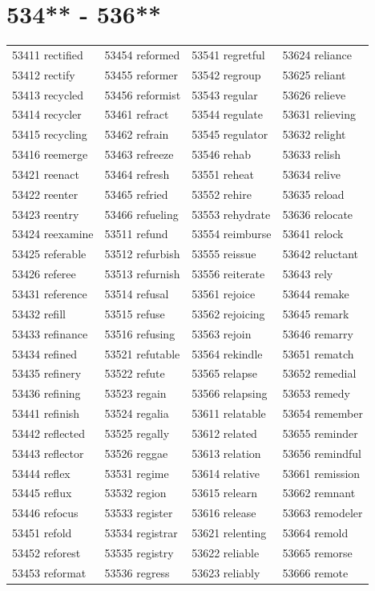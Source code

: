 \documentclass[10pt, oneside]{book}
\begin{document}
\begin{table}
	\centering
	\section*{534** - 536**}
	\begin{tabular}{l l l l}
53411 rectified &53454 reformed &53541 regretful &53624 reliance\\
53412 rectify &53455 reformer &53542 regroup &53625 reliant\\
53413 recycled &53456 reformist &53543 regular &53626 relieve\\
53414 recycler &53461 refract &53544 regulate &53631 relieving\\
53415 recycling &53462 refrain &53545 regulator &53632 relight\\
53416 reemerge &53463 refreeze &53546 rehab &53633 relish\\
53421 reenact &53464 refresh &53551 reheat &53634 relive\\
53422 reenter &53465 refried &53552 rehire &53635 reload\\
53423 reentry &53466 refueling &53553 rehydrate &53636 relocate\\
53424 reexamine &53511 refund &53554 reimburse &53641 relock\\
53425 referable &53512 refurbish &53555 reissue &53642 reluctant\\
53426 referee &53513 refurnish &53556 reiterate &53643 rely\\
53431 reference &53514 refusal &53561 rejoice &53644 remake\\
53432 refill &53515 refuse &53562 rejoicing &53645 remark\\
53433 refinance &53516 refusing &53563 rejoin &53646 remarry\\
53434 refined &53521 refutable &53564 rekindle &53651 rematch\\
53435 refinery &53522 refute &53565 relapse &53652 remedial\\
53436 refining &53523 regain &53566 relapsing &53653 remedy\\
53441 refinish &53524 regalia &53611 relatable &53654 remember\\
53442 reflected &53525 regally &53612 related &53655 reminder\\
53443 reflector &53526 reggae &53613 relation &53656 remindful\\
53444 reflex &53531 regime &53614 relative &53661 remission\\
53445 reflux &53532 region &53615 relearn &53662 remnant\\
53446 refocus &53533 register &53616 release &53663 remodeler\\
53451 refold &53534 registrar &53621 relenting &53664 remold\\
53452 reforest &53535 registry &53622 reliable &53665 remorse\\
53453 reformat &53536 regress &53623 reliably &53666 remote\\
	\end{tabular}
 \end{table}
\clearpage
\end{document}
